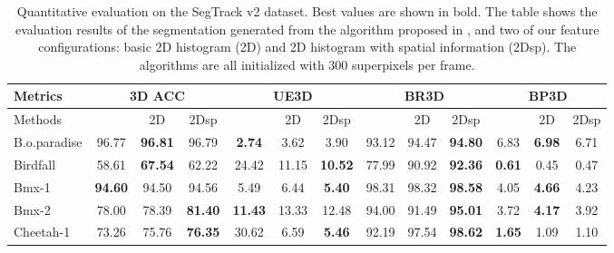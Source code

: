 \documentclass[runningheads]{llncs}
\begin{document}
\begin{table}
\caption{Quantitative evaluation on the SegTrack v2 dataset. Best values are shown in bold. The table shows the evaluation results of the segmentation generated from the algorithm proposed in \cite{Yu_2015_ICCV}, and two of our feature configurations: basic 2D histogram (2D) and 2D histogram with spatial information (2Dsp). The algorithms are all initialized with 300 superpixels per frame.}
\begin{center}

\begin{adjustbox}{max width=\textwidth}
\begin{tabular}{|l|c|c|c||c|c|c||c|c|c||c|c|c|}
\hline
Metrics            & \multicolumn{3}{c|}{3D ACC}                        & \multicolumn{3}{c|}{UE3D}                        & \multicolumn{3}{c|}{BR3D}                        & \multicolumn{3}{c|}{BP3D}                      \\ \hline
Methods            & \cite{Yu_2015_ICCV}              & 2D             & 2Dsp            & \cite{Yu_2015_ICCV}              & 2D             & 2Dsp            & \cite{Yu_2015_ICCV}              & 2D             & 2Dsp            & \cite{Yu_2015_ICCV}              & 2D            & 2Dsp           \\ \hline
B.o.paradise & 96.77          & \textbf{96.81} & 96.79          & \textbf{2.74}  & 3.62           & 3.90           & 93.12          & 94.47          & \textbf{94.80} & 6.83           & \textbf{6.98} & 6.71          \\ \hline
Birdfall           & 58.61          & \textbf{67.54} & 62.22          & 24.42          & 11.15          & \textbf{10.52} & 77.99          & 90.92          & \textbf{92.36} & \textbf{0.61}  & 0.45          & 0.47          \\ \hline
Bmx-1              & \textbf{94.60} & 94.50          & 94.56          & 5.49           & 6.44           & \textbf{5.40}  & 98.31          & 98.32          & \textbf{98.58} & 4.05           & \textbf{4.66} & 4.23          \\ \hline
Bmx-2              & 78.00          & 78.39          & \textbf{81.40} & \textbf{11.43} & 13.33          & 12.48          & 94.00          & 91.49          & \textbf{95.01} & 3.72           & \textbf{4.17} & 3.92          \\ \hline
Cheetah-1          & 73.26          & 75.76          & \textbf{76.35} & 30.62          & 6.59           & \textbf{5.46}  & 92.19          & 97.54          & \textbf{98.62} & \textbf{1.65}  & 1.09          & 1.10          \\ \hline

\end{tabular}
\end{adjustbox}
\end{center}
\end{table}
\end{document}
